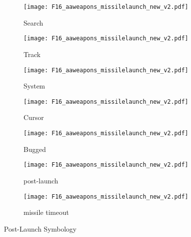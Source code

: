 \begin{figure}[htbp]
    \centering
    \begin{subfigure}[b]{0.15\linewidth}
        \centering
        \texttt{[image: F16\_aaweapons\_missilelaunch\_new\_v2.pdf]}
        \caption{Search}
    \end{subfigure}
    \begin{subfigure}[b]{0.15\linewidth}
        \centering
        \texttt{[image: F16\_aaweapons\_missilelaunch\_new\_v2.pdf]}
        \caption{Track}
    \end{subfigure}
    \begin{subfigure}[b]{0.15\linewidth}
        \centering
        \texttt{[image: F16\_aaweapons\_missilelaunch\_new\_v2.pdf]}
        \caption{System}
    \end{subfigure}
    \begin{subfigure}[b]{0.15\linewidth}
        \centering
        \texttt{[image: F16\_aaweapons\_missilelaunch\_new\_v2.pdf]}
        \caption{Cursor}
    \end{subfigure}
    \begin{subfigure}[b]{0.15\linewidth}
        \centering
        \texttt{[image: F16\_aaweapons\_missilelaunch\_new\_v2.pdf]}
        \caption{Bugged}
    \end{subfigure}
    \begin{subfigure}[b]{0.3\linewidth}
        \centering
        \texttt{[image: F16\_aaweapons\_missilelaunch\_new\_v2.pdf]}
        \caption{post-launch}
    \end{subfigure}
    \begin{subfigure}[b]{0.3\linewidth}
        \centering
        \texttt{[image: F16\_aaweapons\_missilelaunch\_new\_v2.pdf]}
        \caption{missile timeout}
    \end{subfigure}
    \caption{Post-Launch Symbology}
\end{figure}


